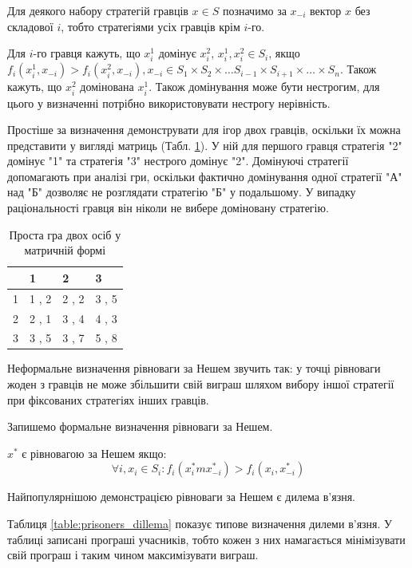 Для деякого набору стратегій гравців $x \in S$ позначимо за $x_{-i}$ вектор $x$ без складової $i$, тобто стратегіями усіх гравців крім $i$-го.

Для $i$-го гравця кажуть, що $x^1_i$ домінує $x^2_i$, $x^1_i, x^2_i \in S_i$, якщо $f_i(x^1_i, x_{-i}) > f_i(x^2_i, x_{-i}), x_{-i} \in S_1 \times S_2 \times \ldots S_{i-1} \times S_{i+1} \times \ldots \times S_n$. Також кажуть, що $x^2_i$ домінована $x^1_i$. Також домінування може бути нестрогим, для цього у визначенні потрібно використовувати нестрогу нерівність.

Простіше за визначення демонструвати для ігор двох гравців, оскільки їх можна представити у вигляді матриць (Табл. \ref{table:simple_game}). У ній для першого гравця стратегія "2" домінує "1" та стратегія "3" нестрого домінує "2". Домінуючі стратегії допомагають при аналізі гри, оскільки фактично домінування одної стратегії "А" над "Б" дозволяє не розглядати стратегію "Б" у подальшому. У випадку раціональності гравця він ніколи не вибере доміновану стратегію.

\begin{table}[H]
	\caption{Проста гра двох осіб у матричній формі}
	\label{table:simple_game}
	\centering
	\begin{tabular}{|p{1cm}|p{1cm}|p{1cm}|p{1cm}|}
		\hline
		        & 1     & 2     & 3
		\\ \hline
		1 		& 1 , 2 & 2 , 2 & 3 , 5
		\\ \hline
		2 		& 2 , 1 & 3 , 4 & 4 , 3
		\\ \hline
		3 		& 3 , 5 & 3 , 7 & 5 , 8
		\\ \hline
	\end{tabular}
\end{table}

Неформальне визначення рівноваги за Нешем звучить так: у точці рівноваги жоден з гравців не може збільшити свій виграш шляхом вибору іншої стратегії при фіксованих стратегіях інших гравців.

Запишемо формальне визначення рівноваги за Нешем.

$x^*$ є рівновагою за Нешем якщо:
\begin{equation}
	\forall i, x_i \in S_i : f_i(x^*_im x^*_{-i}) > f_i(x_i, x^*_{-i})	
	\label{eq:nash_equilibrium_def}
\end{equation}

Найпопулярнішою демонстрацією рівноваги за Нешем є дилема в'язня.

Таблиця \ref{table:prisoners_dillema} показує типове визначення дилеми в'язня. У таблиці записані програші учасників, тобто кожен з них намагається мінімізувати свій програш і таким чином максимізувати виграш.

